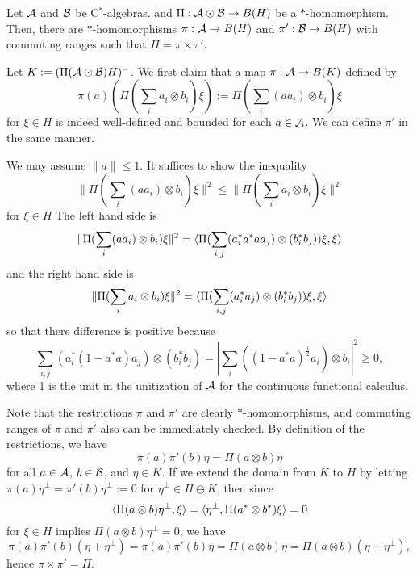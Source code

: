 \documentclass{../../small}
\begin{document}
\begin{lem}
Let $\mathcal{A}$ and $\mathcal{B}$ be C$^*$-algebras. and $\Pi:\mathcal{A}\odot\mathcal{B}\to B(H)$ be a $*$-homomorphism.
Then, there are $*$-homomorphisms $\pi:\mathcal{A}\to B(H)$ and $\pi':\mathcal{B}\to B(H)$ with commuting ranges such that $\Pi=\pi\times\pi'$.
\end{lem}
\begin{pf}
Let $K:=(\Pi(\mathcal{A}\odot\mathcal{B})H)^-$.
We first claim that a map $\pi:\mathcal{A}\to B(K)$ defined by
\[\pi(a)(\Pi(\sum_ia_i\otimes b_i)\xi):=\Pi(\sum_i(aa_i)\otimes b_i)\xi\]
for $\xi\in H$ is indeed well-defined and bounded for each $a\in\mathcal{A}$.
We can define $\pi'$ in the same manner.

We may assume $\|a\|\le1$.
It suffices to show the inequality
\[\|\Pi(\sum_i(aa_i)\otimes b_i)\xi\|^2\le\|\Pi(\sum_ia_i\otimes b_i)\xi\|^2\]
for $\xi\in H$
The left hand side is
\[\|\Pi(\sum_i(aa_i)\otimes b_i)\xi\|^2
=\langle\Pi(\sum_{i,j}(a_i^*a^*aa_j)\otimes(b_i^*b_j))\xi,\xi\rangle\]
and the right hand side is
\[\|\Pi(\sum_ia_i\otimes b_i)\xi\|^2
=\langle\Pi(\sum_{i,j}(a_i^*a_j)\otimes(b_i^*b_j))\xi,\xi\rangle\]
so that there difference is positive because
\[\sum_{i,j}(a_i^*(1-a^*a)a_j)\otimes(b_i^*b_j)=|\sum_i((1-a^*a)^{\frac12}a_i)\otimes b_i|^2\ge0,\]
where 1 is the unit in the unitization of $\mathcal{A}$ for the continuous functional calculus.

Note that the restrictions $\pi$ and $\pi'$ are clearly $*$-homomorphisms, and commuting ranges of $\pi$ and $\pi'$ also can be immediately checked.
By definition of the restrictions, we have
\[\pi(a)\pi'(b)\eta=\Pi(a\otimes b)\eta\]
for all $a\in\mathcal{A}$, $b\in\mathcal{B}$, and $\eta\in K$.
If we extend the domain from $K$ to $H$ by letting $\pi(a)\eta^\perp=\pi'(b)\eta^\perp:=0$ for $\eta^\perp\in H\ominus K$, then since
\[\langle\Pi(a\otimes b)\eta^\perp,\xi\rangle=\langle\eta^\perp,\Pi(a^*\otimes b^*)\xi\rangle=0\]
for $\xi\in H$ implies $\Pi(a\otimes b)\eta^\perp=0$, we have
\[\pi(a)\pi'(b)(\eta+\eta^\perp)=\pi(a)\pi'(b)\eta=\Pi(a\otimes b)\eta=\Pi(a\otimes b)(\eta+\eta^\perp),\]
hence $\pi\times\pi'=\Pi$.
\end{pf}
\end{document}
